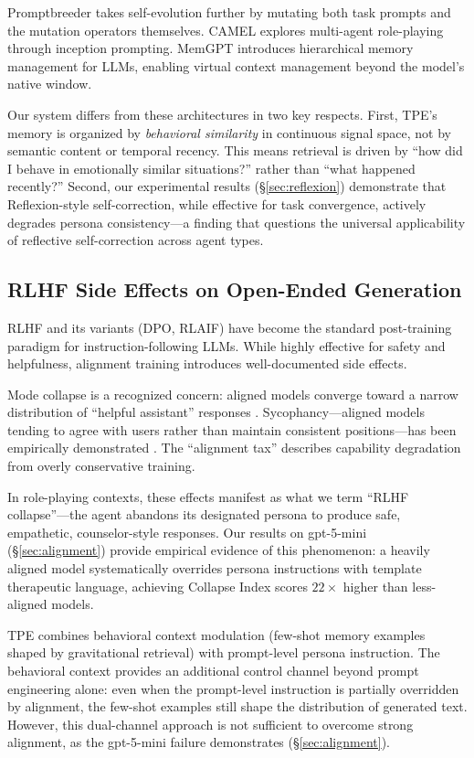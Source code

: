 Promptbreeder \cite{fernando2023promptbreeder} takes self-evolution further by mutating both task prompts and the mutation operators themselves. CAMEL \cite{li2023camel} explores multi-agent role-playing through inception prompting. MemGPT \cite{packer2024memgpt} introduces hierarchical memory management for LLMs, enabling virtual context management beyond the model's native window.

Our system differs from these architectures in two key respects. First, TPE's memory is organized by \emph{behavioral similarity} in continuous signal space, not by semantic content or temporal recency. This means retrieval is driven by ``how did I behave in emotionally similar situations?'' rather than ``what happened recently?'' Second, our experimental results (\S\ref{sec:reflexion}) demonstrate that Reflexion-style self-correction, while effective for task convergence, actively degrades persona consistency---a finding that questions the universal applicability of reflective self-correction across agent types.

\subsection{RLHF Side Effects on Open-Ended Generation}

RLHF \cite{ouyang2022training} and its variants (DPO, RLAIF) have become the standard post-training paradigm for instruction-following LLMs. While highly effective for safety and helpfulness, alignment training introduces well-documented side effects.

Mode collapse is a recognized concern: aligned models converge toward a narrow distribution of ``helpful assistant'' responses \cite{kirk2023understanding}. Sycophancy---aligned models tending to agree with users rather than maintain consistent positions---has been empirically demonstrated \cite{perez2022discovering}. The ``alignment tax'' \cite{askell2021general} describes capability degradation from overly conservative training.

In role-playing contexts, these effects manifest as what we term ``RLHF collapse''---the agent abandons its designated persona to produce safe, empathetic, counselor-style responses. Our results on gpt-5-mini (\S\ref{sec:alignment}) provide empirical evidence of this phenomenon: a heavily aligned model systematically overrides persona instructions with template therapeutic language, achieving Collapse Index scores $22\times$ higher than less-aligned models.

TPE combines behavioral context modulation (few-shot memory examples shaped by gravitational retrieval) with prompt-level persona instruction. The behavioral context provides an additional control channel beyond prompt engineering alone: even when the prompt-level instruction is partially overridden by alignment, the few-shot examples still shape the distribution of generated text. However, this dual-channel approach is not sufficient to overcome strong alignment, as the gpt-5-mini failure demonstrates (\S\ref{sec:alignment}).
